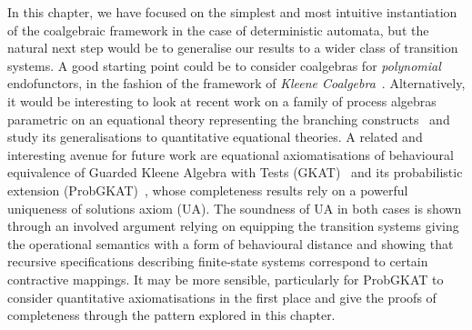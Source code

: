 In this chapter, we have focused on the simplest and most intuitive instantiation of the coalgebraic framework in the case of deterministic automata, but the natural next step would be to generalise our results to a wider class of transition systems. A good starting point could be to consider coalgebras for \emph{polynomial} endofunctors, in the fashion of the framework of \emph{Kleene Coalgebra}~\cite{Silva:2010:Kleene}. Alternatively, it would be interesting to look at recent work on a family of process algebras parametric on an equational theory representing the branching constructs~\cite{Schmid:2022:Processes} and study its generalisations to quantitative equational theories. A related and interesting avenue for future work are equational axiomatisations of behavioural equivalence of Guarded Kleene Algebra with Tests (GKAT)~\cite{Smolka:2020:Guarded,Schmid:2022:Processes} and its probabilistic extension (ProbGKAT)~\cite{Rozowski:2023:Probabilistic}, whose completeness results rely on a powerful uniqueness of solutions axiom (UA). The soundness of UA in both cases is shown through an involved argument relying on equipping the transition systems giving the operational semantics with a form of behavioural distance and showing that recursive specifications describing finite-state systems correspond to certain contractive mappings. It may be more sensible, particularly for ProbGKAT to consider quantitative axiomatisations in the first place and give the proofs of completeness through the pattern explored in this chapter.
